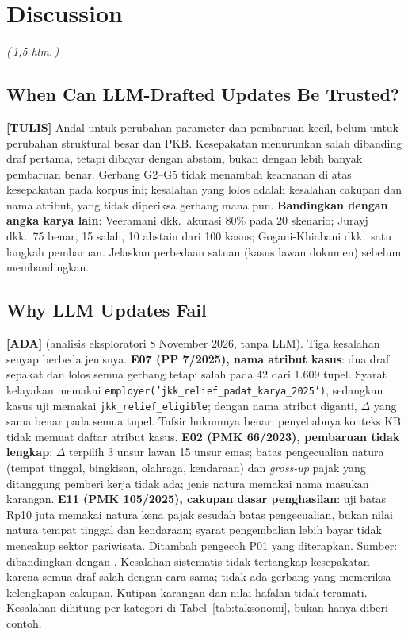 \documentclass{ieeeaccess}
\newcommand{\ADA}{\textcolor{stada}{\textbf{[ADA]}}}
\newcommand{\TULIS}{\textcolor{sttulis}{\textbf{[TULIS]}}}
\newcommand{\hal}[1]{\textcolor{draftblue}{\textit{(\,#1 hlm.\,)}}}
\newenvironment{isi}{\par\smallskip\footnotesize\color{draftblue}\noindent}{\par\smallskip\normalsize\color{black}}
\begin{document}
\section{Discussion}
\label{sec:diskusi}
\hal{1,5}

\subsection{When Can LLM-Drafted Updates Be Trusted?}
\begin{isi}
\TULIS{} Andal untuk perubahan parameter dan pembaruan kecil, belum untuk perubahan struktural besar dan PKB. Kesepakatan menurunkan salah dibanding draf pertama, tetapi dibayar dengan abstain, bukan dengan lebih banyak pembaruan benar. Gerbang G2--G5 tidak menambah keamanan di atas kesepakatan pada korpus ini; kesalahan yang lolos adalah kesalahan cakupan dan nama atribut, yang tidak diperiksa gerbang mana pun. \textbf{Bandingkan dengan angka karya lain}: Veeramani dkk.\ akurasi 80\% pada 20 skenario; Jurayj dkk.\ 75 benar, 15 salah, 10 abstain dari 100 kasus; Gogani-Khiabani dkk.\ satu langkah pembaruan. Jelaskan perbedaan satuan (kasus lawan dokumen) sebelum membandingkan.
\end{isi}

\subsection{Why LLM Updates Fail}
\begin{isi}
\ADA{} (analisis eksploratori 8 November 2026, tanpa LLM). Tiga kesalahan senyap berbeda jenisnya.
\textbf{E07 (PP 7/2025), nama atribut kasus}: dua draf sepakat dan lolos semua gerbang tetapi salah pada 42 dari 1.609 tupel. Syarat kelayakan memakai \texttt{employer('jkk\_relief\_padat\_karya\_2025')}, sedangkan kasus uji memakai \texttt{jkk\_relief\_eligible}; dengan nama atribut diganti, $\Delta$ yang sama benar pada semua tupel. Tafsir hukumnya benar; penyebabnya konteks KB tidak memuat daftar atribut kasus.
\textbf{E02 (PMK 66/2023), pembaruan tidak lengkap}: $\Delta$ terpilih 3 unsur lawan 15 unsur emas; batas pengecualian natura (tempat tinggal, bingkisan, olahraga, kendaraan) dan \textit{gross-up} pajak yang ditanggung pemberi kerja tidak ada; jenis natura memakai nama masukan karangan.
\textbf{E11 (PMK 105/2025), cakupan dasar penghasilan}: uji batas Rp10 juta memakai natura kena pajak sesudah batas pengecualian, bukan nilai natura tempat tinggal dan kendaraan; syarat pengembalian lebih bayar tidak mencakup sektor pariwisata.
Ditambah pengecoh P01 yang diterapkan. Sumber:  dibandingkan dengan . Kesalahan sistematis tidak tertangkap kesepakatan karena semua draf salah dengan cara sama; tidak ada gerbang yang memeriksa kelengkapan cakupan. Kutipan karangan dan nilai hafalan tidak teramati. Kesalahan dihitung per kategori di Tabel~\ref{tab:taksonomi}, bukan hanya diberi contoh.
\end{isi}
\end{document}
